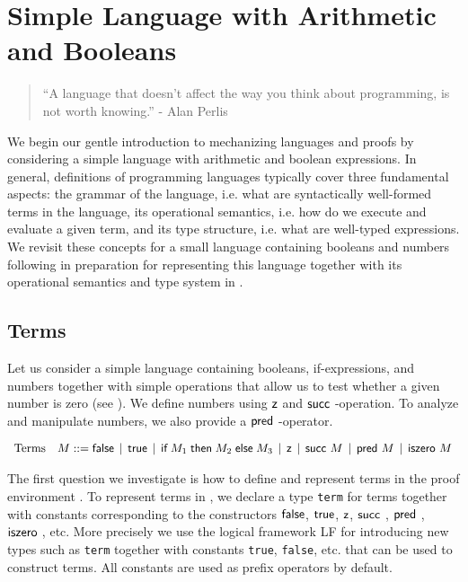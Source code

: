 

\chapter{Simple Language with Arithmetic and Booleans}
\label{chap:basic}
\begin{quote}
``A language that doesn't affect the way you think about programming, is
not worth knowing.''
\hfill - Alan Perlis
\end{quote}

We begin our gentle introduction to mechanizing languages and proofs by
considering a simple language with arithmetic and boolean
expressions. In general, definitions of programming languages
typically cover three fundamental aspects:
the grammar  of the language,  i.e. what are syntactically  well-formed terms in
the language,  its operational semantics,  i.e. how do we execute and evaluate a
given term,  and its  type structure, i.e. what are  well-typed expressions.  We
revisit  these concepts  for  a small language  containing booleans  and numbers
following \citep[Ch 3,Ch 8]{TAPL} in  preparation for representing this language
together with its operational semantics and type system in \beluga.

\section{Terms}\label{sec:terms-basic}
Let  us  consider  a simple language  containing booleans,  if-expressions,  and
numbers together  with simple operations  that allow us  to test whether a given
number is zero (see \cite[Ch 3, Fig 3-1,Fig 3-2]{TAPL}). We define numbers using
$\textsf{z}$ and $\tmsucc$-operation.  To analyze  and manipulate numbers,  we also
provide a $\tmpred$-operator.

\[
\begin{array}{ll@{\bnfas}l}
\mbox{Terms} & M & \tmfalse \bnfalt \tmtrue \bnfalt \tmif{M_1}{M_2}{M_3} \bnfalt
\tmzero \bnfalt \tmsucc M \bnfalt \tmpred M \bnfalt \tmiszero M
\end{array}
\]

The first question  we investigate is  how to define  and represent terms in the
proof  environment  \beluga. To represent  terms  in \beluga,  we declare  a type
\lstinline!term!  for  terms   together  with  constants  corresponding  to  the
constructors    $\textsf{false}$,   $\textsf{true}$,    $\textsf{z}$,   $\tmsucc$,   $\tmpred$,
$\tmiszero$,  etc.   More   precisely   we   use   the   logical   framework  LF
\citep{Harper93jacm} for introducing new types such as \lstinline!term! together
with constants  \lstinline!true!,  \lstinline!false!, etc.  that  can be used to
construct terms. All constants are used as prefix operators by default.

